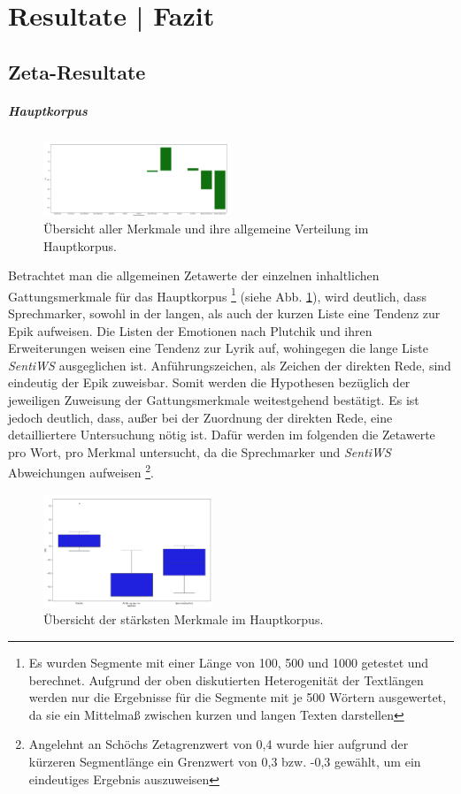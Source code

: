 \documentclass[a4paper,10p]{article}
\begin{document}
\section{Resultate | Fazit}
\subsection{Zeta-Resultate}
\subparagraph{Hauptkorpus} \quad \par 

\begin{figure}
	\includegraphics[width=0.5\textwidth]{haupt_alle_merkmale.png}
	\caption{Übersicht aller Merkmale und ihre allgemeine Verteilung im Hauptkorpus.}
	\label{fig:haupt_alle_merkmale}
\end{figure}

Betrachtet man die allgemeinen Zetawerte der einzelnen inhaltlichen Gattungsmerkmale für das Hauptkorpus \footnote{Es wurden Segmente mit einer Länge von 100, 500 und 1000 getestet und berechnet. Aufgrund der oben diskutierten Heterogenität der Textlängen werden nur die Ergebnisse für die Segmente mit je 500 Wörtern ausgewertet, da sie ein Mittelmaß zwischen kurzen und langen Texten darstellen} (siehe Abb.  \ref{fig:haupt_alle_merkmale}), wird deutlich, dass Sprechmarker, sowohl in der langen, als auch der kurzen Liste eine Tendenz zur Epik aufweisen. Die Listen der Emotionen nach Plutchik und ihren Erweiterungen weisen eine Tendenz zur Lyrik auf, wohingegen die lange Liste \textit{SentiWS} ausgeglichen ist. Anführungszeichen, als Zeichen der direkten Rede, sind eindeutig der Epik zuweisbar. Somit werden die Hypothesen bezüglich der jeweiligen Zuweisung der Gattungsmerkmale weitestgehend bestätigt. Es ist jedoch deutlich, dass, außer bei der Zuordnung der direkten Rede, eine detailliertere Untersuchung nötig ist. Dafür werden im folgenden die Zetawerte pro Wort, pro Merkmal untersucht, da die Sprechmarker und \textit{SentiWS} Abweichungen aufweisen \footnote{Angelehnt an Schöchs Zetagrenzwert von 0,4 wurde hier aufgrund der kürzeren Segmentlänge ein Grenzwert von 0,3 bzw. -0,3 gewählt, um ein eindeutiges Ergebnis auszuweisen}.\par 

\begin{figure}
	\includegraphics[width=0.45\textwidth]{haupt_staerkste_merkmale_boxplot.png}
	\caption{Übersicht der stärksten Merkmale im Hauptkorpus.}
	\label{fig:haupt_staerkste_merkmale_boxplot}
\end{figure}
\end{document}
